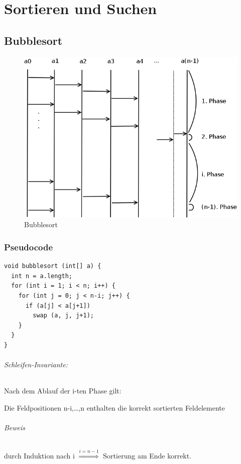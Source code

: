 \part{Sortieren und Suchen}
\chapter{Bubblesort}


\begin{figure}[H]
\begin{center}
\includegraphics[width=0.8\linewidth]{01/Grafik/Bubblesort.png}
\caption{Bubblesort}
\end{center}
\end{figure}


\section{Pseudocode}
\begin{lstlisting}[style = pseudo]
void bubblesort (int[] a) {
  int n = a.length;
  for (int i = 1; i < n; i++) {
    for (int j = 0; j < n-i; j++) {
      if (a[j] < a[j+1])
        swap (a, j, j+1);
    }
  }
}
\end{lstlisting}
\paragraph{Schleifen-Invariante:} Nach dem Ablauf der i-ten Phase gilt:
\begin{center}
	Die Feldpositionen n-i,\ldots,n enthalten die korrekt sortierten Feldelemente
\end{center}
\paragraph{Beweis} durch Induktion nach i $\overset{i=n-1}{\Longrightarrow}$ Sortierung am Ende korrekt.


